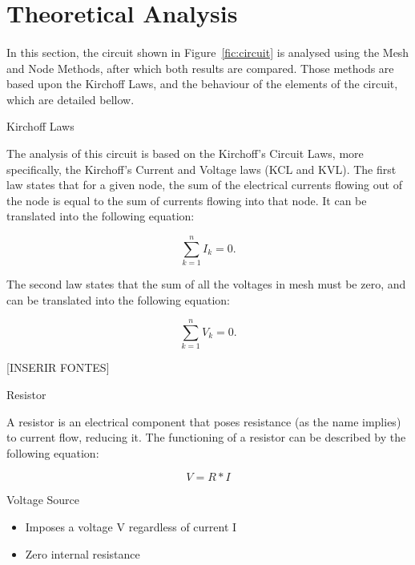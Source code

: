 \section{Theoretical Analysis}
\label{sec:analysis}

\paragraph{} In this section, the circuit shown in Figure~\ref{fic:circuit} is analysed using the Mesh and Node Methods, after which both results are compared.
Those methods are based upon the Kirchoff Laws, and the behaviour of the elements of the circuit, which are detailed bellow.

Kirchoff Laws

The analysis of this circuit is based on the Kirchoff's Circuit Laws, more specifically, the Kirchoff's Current and Voltage laws (KCL and KVL). The first law states that
 for a given node, the sum of the electrical currents flowing out of the node is equal to the sum of currents flowing into that node. 
It can be translated into the following equation:

\begin{equation}
	\sum_{k = 1}^n I_k = 0.
	\label{eq:kcl}
\end{equation}

The second law states that the sum of all the voltages in mesh must be zero, and can be translated into the following equation:

\begin{equation}
	\sum_{k = 1}^n V_k = 0.
	\label{eq:kvl}
\end{equation}

[INSERIR FONTES]

Resistor

A resistor is an electrical component that poses resistance (as the name implies) to current flow, reducing it. The functioning of a resistor can be described
 by the following equation:

\begin{equation}
	V = R * I
	\label{eq:kvl}
\end{equation}

Voltage Source

\begin{itemize}
	\item Imposes a voltage V regardless of current I
	\item Zero internal resistance
\end{itemize}

